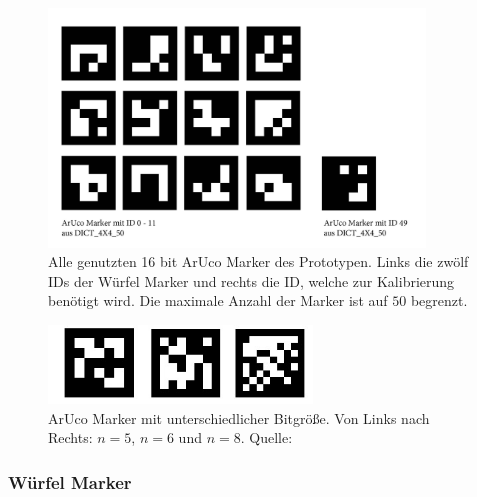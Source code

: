 \begin{figure}[H] 
	\center 
	\includegraphics[width=10cm]{Bilder/Aruco_marker.jpg}			
	\caption{Alle genutzten 16 bit ArUco Marker des Prototypen. Links die zwölf IDs der Würfel Marker und rechts die ID, welche zur Kalibrierung benötigt wird. Die maximale Anzahl der Marker ist auf $50$ begrenzt.}
	\label{fig:AllUsedArucoMarker}
\end{figure}

\begin{figure}[H] 
	\center 
	\includegraphics[width=7cm]{Bilder/VerschAruco.jpg}			
	\caption{ArUco Marker mit unterschiedlicher Bitgröße. Von Links nach Rechts: $n=5$, $n=6$ und $n=8$. Quelle: \cite{article:Aruco2014}}
	\label{fig:SizesArucoMarker}
\end{figure}

\subsubsection{Würfel Marker}\label{sec:WürfelMarker} 

